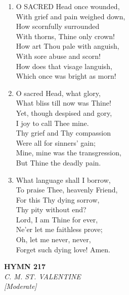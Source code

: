 \begin{enumerate}
    \item O SACRED Head once wounded, \\
            With grief and pain weighed down, \\
        How scornfully surrounded \\
            With thorns, Thine only crown! \\
        How art Thou pale with anguish, \\
            With sore abuse and scorn! \\
        How does that visage languish, \\
            Which once was bright as morn!

    \item O sacred Head, what glory, \\
            What bliss till now was Thine! \\
        Yet, though despised and gory, \\
            I joy to call Thee mine. \\
        Thy grief and Thy compassion \\
            Were all for sinners' gain; \\
        Mine, mine was the transgression, \\
            But Thine the deadly pain.

    \item What language shall I borrow, \\
            To praise Thee, heavenly Friend, \\
        For this Thy dying sorrow, \\
            Thy pity without end? \\
        Lord, I am Thine for ever, \\
            Ne'er let me faithless prove; \\
        Oh, let me never, never, \\
            Forget such dying love! Amen.

\end{enumerate}

\newpage
\begin{center}
    {\Large \textbf{HYMN 217}}
    \\
    \textit{C. M. ST. VALENTINE}
    \\
    \textit{\small [Moderate]}
\end{center}
\vspace{1em}

